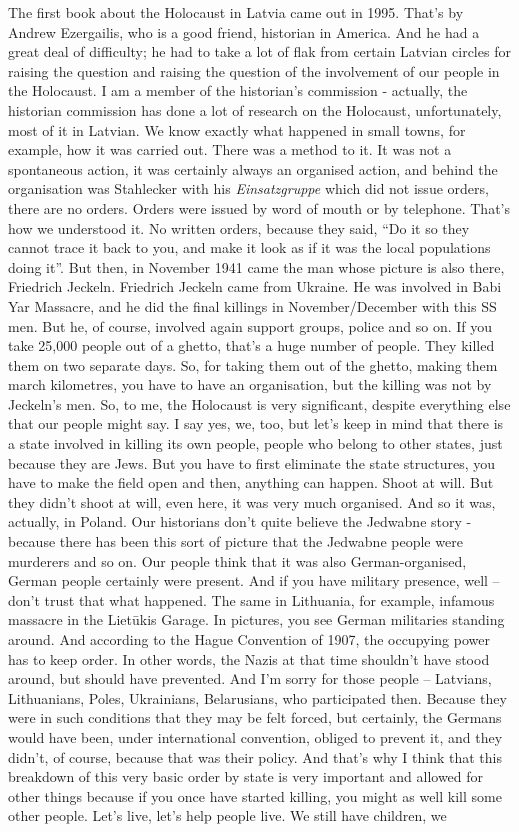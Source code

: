 The first book about the Holocaust in Latvia came out in 1995. That’s by Andrew Ezergailis, who is a good friend, historian in America. And he had a great deal of difficulty; he had to take a lot of flak from certain Latvian circles for raising the question and raising the question of the involvement of our people in the Holocaust. I am a member of the historian’s commission - actually, the historian commission has done a lot of research on the Holocaust, unfortunately, most of it in Latvian. We know exactly what happened in small towns, for example, how it was carried out. There was a method to it. It was not a spontaneous action, it was certainly always an organised action, and behind the organisation was Stahlecker with his \textit{Einsatzgruppe} which did not issue orders, there are no orders. Orders were issued by word of mouth or by telephone. That’s how we understood it. No written orders, because they said, ``Do it so they cannot trace it back to you, and make it look as if it was the local populations doing it''. But then, in November 1941 came the man whose picture is also there, Friedrich Jeckeln. Friedrich Jeckeln came from Ukraine. He was involved in Babi Yar Massacre, and he did the final killings in November/December with this SS men. But he, of course, involved again support groups, police and so on. If you take 25,000 people out of a ghetto, that’s a huge number of people. They killed them on two separate days. So, for taking them out of the ghetto, making them march kilometres, you have to have an organisation, but the killing was not by Jeckeln’s men. So, to me, the Holocaust is very significant, despite everything else that our people might say. I say yes, we, too, but let’s keep in mind that there is a state involved in killing its own people, people who belong to other states, just because they are Jews. But you have to first eliminate the state structures, you have to make the field open and then, anything can happen. Shoot at will. But they didn’t shoot at will, even here, it was very much organised. And so it was, actually, in Poland. Our historians don’t quite believe the Jedwabne story - because there has been this sort of picture that the Jedwabne people were murderers and so on. Our people think that it was also German-organised, German people certainly were present. And if you have military presence, well – don’t trust that what happened. The same in Lithuania, for example, infamous massacre in the Lietūkis Garage. In pictures, you see German militaries standing around. And according to the Hague Convention of 1907,  the occupying power has to keep order. In other words, the Nazis at that time shouldn't have stood around, but should have prevented. And I’m sorry for those people – Latvians, Lithuanians, Poles, Ukrainians, Belarusians, who participated then. Because they were in such conditions that they may be felt forced, but certainly, the Germans would have been, under international convention, obliged to prevent it, and they didn’t, of course, because that was their policy. And that’s why I think that this breakdown of this very basic order by state is very important and allowed for other things because if you once have started killing, you might as well kill some other people. Let’s live, let’s help people live. We still have children, we 